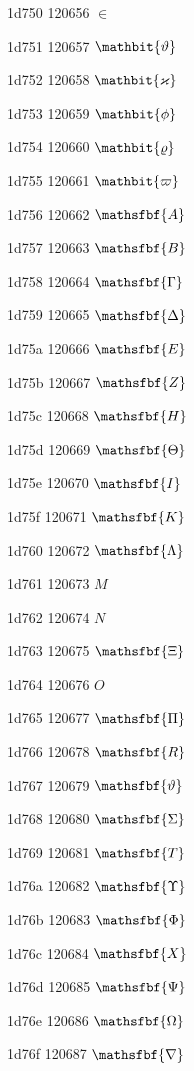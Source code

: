 \documentclass[11pt]{article}
\begin{document}
1d750 120656 \ensuremath{\in}

1d751 120657 \ensuremath{\mathbit{\vartheta}}

1d752 120658 \ensuremath{\mathbit{\varkappa}}

1d753 120659 \ensuremath{\mathbit{\phi}}

1d754 120660 \ensuremath{\mathbit{\varrho}}

1d755 120661 \ensuremath{\mathbit{\varpi}}

1d756 120662 \ensuremath{\mathsfbf{A}}

1d757 120663 \ensuremath{\mathsfbf{B}}

1d758 120664 \ensuremath{\mathsfbf{\Gamma}}

1d759 120665 \ensuremath{\mathsfbf{\Delta}}

1d75a 120666 \ensuremath{\mathsfbf{E}}

1d75b 120667 \ensuremath{\mathsfbf{Z}}

1d75c 120668 \ensuremath{\mathsfbf{H}}

1d75d 120669 \ensuremath{\mathsfbf{\Theta}}

1d75e 120670 \ensuremath{\mathsfbf{I}}

1d75f 120671 \ensuremath{\mathsfbf{K}}

1d760 120672 \ensuremath{\mathsfbf{\Lambda}}

1d761 120673 \ensuremath{M}

1d762 120674 \ensuremath{N}

1d763 120675 \ensuremath{\mathsfbf{\Xi}}

1d764 120676 \ensuremath{O}

1d765 120677 \ensuremath{\mathsfbf{\Pi}}

1d766 120678 \ensuremath{\mathsfbf{R}}

1d767 120679 \ensuremath{\mathsfbf{\vartheta}}

1d768 120680 \ensuremath{\mathsfbf{\Sigma}}

1d769 120681 \ensuremath{\mathsfbf{T}}

1d76a 120682 \ensuremath{\mathsfbf{\Upsilon}}

1d76b 120683 \ensuremath{\mathsfbf{\Phi}}

1d76c 120684 \ensuremath{\mathsfbf{X}}

1d76d 120685 \ensuremath{\mathsfbf{\Psi}}

1d76e 120686 \ensuremath{\mathsfbf{\Omega}}

1d76f 120687 \ensuremath{\mathsfbf{\nabla}}
\end{document}
